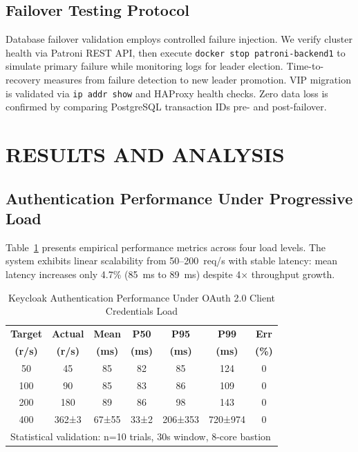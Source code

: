 \documentclass[a4paper,twoside]{article}
\begin{document}
\subsection{Failover Testing Protocol}

Database failover validation employs controlled failure injection. We verify cluster health via Patroni REST API, then execute \texttt{docker stop patroni-backend1} to simulate primary failure while monitoring logs for leader election. Time-to-recovery measures from failure detection to new leader promotion. VIP migration is validated via \texttt{ip addr show} and HAProxy health checks. Zero data loss is confirmed by comparing PostgreSQL transaction IDs pre- and post-failover.

\section{\uppercase{Results and Analysis}}
\label{sec:results}

\subsection{Authentication Performance Under Progressive Load}

Table~\ref{tab:gatling-results} presents empirical performance metrics across four load levels. The system exhibits linear scalability from 50--200~req/s with stable latency: mean latency increases only 4.7\% (85~ms to 89~ms) despite 4× throughput growth.

\begin{table}[!t]
\centering
\caption{Keycloak Authentication Performance Under OAuth 2.0 Client Credentials Load}
\label{tab:gatling-results}
\renewcommand{\arraystretch}{1.2}
\scriptsize
\begin{tabular}{|c|c|c|c|c|c|c|}
\hline
\textbf{Target} & \textbf{Actual} & \textbf{Mean} & \textbf{P50} & \textbf{P95} & \textbf{P99} & \textbf{Err} \\
\textbf{(r/s)} & \textbf{(r/s)} & \textbf{(ms)} & \textbf{(ms)} & \textbf{(ms)} & \textbf{(ms)} & \textbf{(\%)} \\
\hline
50 & 45 & 85 & 82 & 85 & 124 & 0 \\
\hline
100 & 90 & 85 & 83 & 86 & 109 & 0 \\
\hline
200 & 180 & 89 & 86 & 98 & 143 & 0 \\
\hline
400 & 362±3 & 67±55 & 33±2 & 206±353 & 720±974 & 0 \\
\hline
\multicolumn{7}{l}{\scriptsize Statistical validation: n=10 trials, 30s window, 8-core bastion} \\
\end{tabular}
\end{table}
\end{document}
